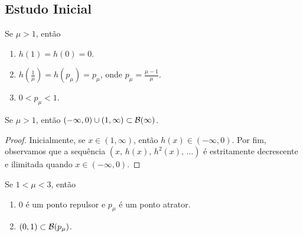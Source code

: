 \subsection{Estudo Inicial}

\begin{proposition}
Se $\mu > 1$, então
\begin{enumerate}
\item $h(1) = h(0) = 0$.
\item $h(\frac{1}{\mu}) = h(p_\mu) = p_\mu$, onde $p_\mu = \frac{\mu-1}{\mu}$.
\item $0 < p_\mu < 1$.
\end{enumerate}
\end{proposition}

\begin{proposition}
Se $\mu > 1$, então $(-\infty, 0) \cup (1, \infty) \subset \mathcal{B}(\infty)$.
\end{proposition}

\begin{proof}
Inicialmente, se $x \in (1, \infty)$, então $h(x) \in (-\infty, 0)$. Por fim, observamos que a sequência  $(x,\, h(x),\, h^2(x),\, \dots)$ é estritamente decrescente e ilimitada quando $x \in (-\infty, 0)$.
\end{proof}

\begin{proposition}
Se $1 < \mu < 3$, então
\begin{enumerate}
\item $0$ é um ponto repulsor e $p_\mu$ é um ponto atrator.
\item $(0, 1) \subset \mathcal{B}(p_\mu)$.
\end{enumerate}
\end{proposition}
